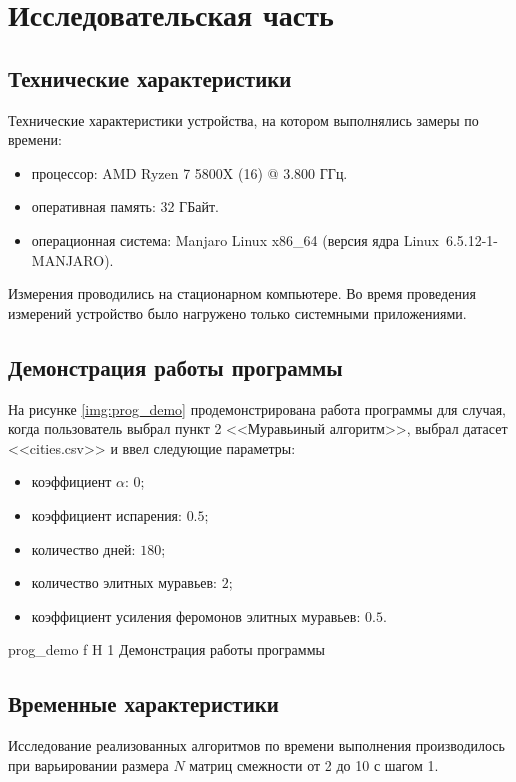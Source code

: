 \chapter{Исследовательская часть}

\section{Технические характеристики}

Технические характеристики устройства, на котором выполнялись замеры по времени:
\begin{itemize}
	\item процессор: AMD Ryzen 7 5800X (16) @ 3.800 ГГц.
	\item оперативная память: 32 ГБайт.
	\item операционная система: Manjaro Linux x86\_64 (версия ядра Linux~6.5.12-1-MANJARO).
\end{itemize}

Измерения проводились на стационарном компьютере.
Во время проведения измерений устройство было нагружено только системными приложениями.

\section{Демонстрация работы программы}

На рисунке \ref{img:prog_demo} продемонстрирована работа программы для случая, когда пользователь выбрал пункт 2 <<Муравьиный алгоритм>>, выбрал датасет <<cities.csv>> и ввел следующие параметры:
\begin{itemize}
	\item коэффициент $\alpha$: $0$;
	\item коэффициент испарения: $0.5$;
	\item количество дней: $180$;
	\item количество элитных муравьев: $2$;
	\item коэффициент усиления феромонов элитных муравьев: $0.5$.
\end{itemize}

	{prog_demo}
	{f}
	{H}
	{1\textwidth}
	{Демонстрация работы программы}

\section{Временные характеристики}

Исследование реализованных алгоритмов по времени выполнения производилось при варьировании размера $N$ матриц смежности от 2 до 10 с шагом 1.

